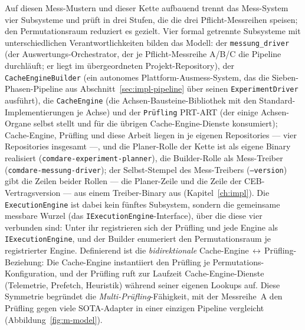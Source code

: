 \begin{nurlang}
Auf diesen Mess-Mustern und dieser Kette aufbauend trennt das Mess-System vier Subsysteme und prüft in drei Stufen, die
die drei Pflicht-Messreihen speisen; den Permutationsraum reduziert es gezielt.
Vier formal getrennte Subsysteme mit unterschiedlichen Verantwortlichkeiten bilden das Modell: der
\texttt{messung\_driver} (der Auswertungs-Orchestrator, der je Pflicht-Messreihe A/B/C die Pipeline
durchläuft; er liegt im übergeordneten Projekt-Repository), der \texttt{CacheEngineBuilder} (ein
autonomes Plattform-Ausmess-System, das die Sieben-Phasen-Pipeline aus Abschnitt~\ref{sec:impl-pipeline}
über seinen \texttt{ExperimentDriver} ausführt), die \texttt{CacheEngine} (die Achsen-Bausteine-Bibliothek
mit den Standard-Implementierungen je Achse) und der \texttt{Prüfling} PRT-ART (der einige Achsen-Organe
selbst stellt und für die übrigen Cache-Engine-Dienste konsumiert); Cache-Engine, Prüfling und diese
Arbeit liegen in je eigenen Repositories --- vier Repositories insgesamt ---, und die Planer-Rolle der
Kette ist als eigene Binary realisiert (\texttt{comdare-experiment-planner}), die Builder-Rolle als Mess-Treiber
(\texttt{comdare-messung-driver}); der Selbst-Stempel des Mess-Treibers (\texttt{--version}) gibt die
Zeilen beider Rollen --- die Planer-Zeile und die Zeile der CEB-Vertragsversion --- aus einem
Treiber-Binary aus (Kapitel~\ref{ch:impl}). Die \texttt{ExecutionEngine} ist dabei kein
fünftes Subsystem, sondern die gemeinsame messbare Wurzel (das \texttt{IExecutionEngine}-Interface), über
die diese vier verbunden sind: Unter ihr registrieren sich der Prüfling und jede Engine als
\texttt{IExecutionEngine}, und der Builder enumeriert den Permutationsraum je registrierter Engine.
Definierend ist die \emph{bidirektionale}
Cache-Engine\,$\leftrightarrow$\,Prüfling-Beziehung: Die Cache-Engine instantiiert den Prüfling je
Permutations-Konfiguration, und der Prüfling ruft zur Laufzeit Cache-Engine-Dienste (Telemetrie, Prefetch,
Heuristik) während seiner eigenen Lookups auf. Diese Symmetrie begründet die \emph{Multi-Prüfling}-Fähigkeit,
mit der Messreihe~A den Prüfling gegen viele SOTA-Adapter in einer einzigen Pipeline vergleicht
(Abbildung~\ref{fig:m-model}).


\end{nurlang}
